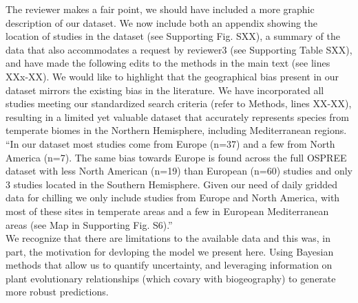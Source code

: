 \documentclass[11pt]{article}
\begin{document}

The reviewer makes a fair point, we should have included a more graphic description of our dataset. We now include both an appendix showing the location of studies in the dataset (see Supporting Fig. SXX), a summary of the data that also accommodates a request by reviewer3 (see Supporting Table SXX), and have made the following edits to the methods in the main text (see lines XXx-XX). We would like to highlight that the geographical bias present in our dataset mirrors the existing bias in the literature. We have incorporated all studies meeting our standardized search criteria (refer to Methods, lines XX-XX), resulting in a limited yet valuable dataset that accurately represents species from temperate biomes in the Northern Hemisphere, including Mediterranean regions.\\

``In our dataset most studies come from Europe (n=37) and a few from North America (n=7). The same bias towards Europe is found across the full OSPREE dataset with less North American (n=19) than European (n=60) studies and only 3 studies located in the Southern Hemisphere. Given our need of daily gridded data for chilling we only include studies from Europe and North America, with most of these sites in temperate areas and a few in European Mediterranean areas (see Map in Supporting Fig. S6).''\\

We recognize that there are limitations to the available data and this was, in part, the motivation for devloping the model we present here. Using Bayesian methods that allow us to quantify uncertainty, and leveraging information on plant evolutionary relationships (which covary with biogeography) to generate more robust predictions.\\ 
\end{document}
